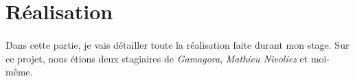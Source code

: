 \section{Réalisation}

\paragraph{}Dans cette partie, je vais détailler toute la réalisation faite durant mon stage. Sur ce projet, nous étions deux stagiaires de \emph{Gamagora}, \emph{Mathieu Nivoliez}
et moi-même.







\newpage





\newpage